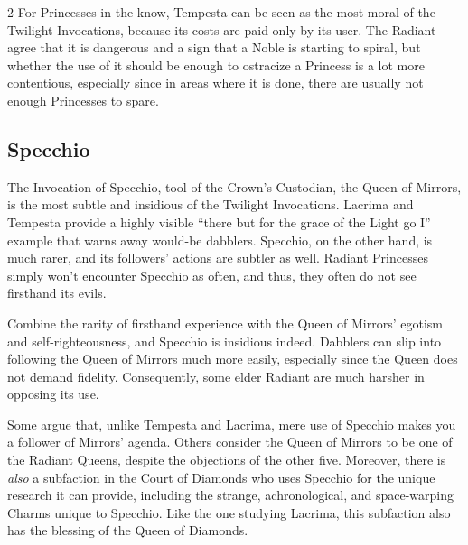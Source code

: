 \begin{multicols}{2}
For Princesses in the know, Tempesta can be seen as the most moral of the Twilight Invocations, because its costs are paid only by its user. The Radiant agree that it is dangerous and a sign that a Noble is starting to spiral, but whether the use of it should be enough to ostracize a Princess is a lot more contentious, especially since in areas where it is done, there are usually not enough Princesses to spare.

\subsection*{Specchio}
The Invocation of Specchio, tool of the Crown's Custodian, the Queen of Mirrors, is the most subtle and insidious of the Twilight Invocations. Lacrima and Tempesta provide a highly visible “there but for the grace of the Light go I” example that warns away would-be dabblers. Specchio, on the other hand, is much rarer, and its followers' actions are subtler as well. Radiant Princesses simply won't encounter Specchio as often, and thus, they often do not see firsthand its evils.

Combine the rarity of firsthand experience with the Queen of Mirrors' egotism and self-righteousness, and Specchio is insidious indeed. Dabblers can slip into following the Queen of Mirrors much more easily, especially since the Queen does not demand fidelity. Consequently, some elder Radiant are much harsher in opposing its use. 

Some argue that, unlike Tempesta and Lacrima, mere use of Specchio makes you a follower of Mirrors' agenda. Others consider the Queen of Mirrors to be one of the Radiant Queens, despite the objections of the other five. Moreover, there is \textit{also} a subfaction in the Court of Diamonds who uses Specchio for the unique research it can provide, including the strange, achronological, and space-warping Charms unique to Specchio. Like the one studying Lacrima, this subfaction also has the blessing of the Queen of Diamonds.


\end{multicols}
